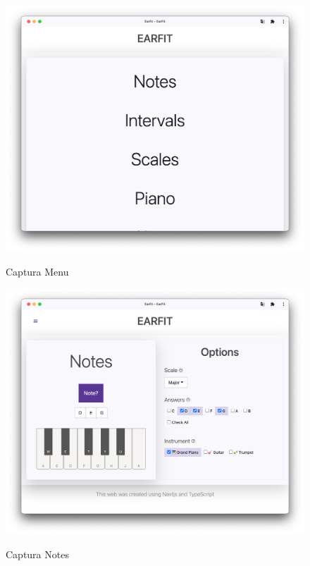 \documentclass[12pt,twoside,titlepage]{report}
\begin{document}
{\begin{figure}[H]
    \centering
    \includegraphics[scale=0.3]{Capturas Earfit/Tablet/Menu}
    \label{fig:TabletMenu}
    \caption{Captura Menu}
\end{figure}

\begin{figure}[H]
    \centering
    \includegraphics[scale=0.3]{Capturas Earfit/Tablet/Notes}
    \label{fig:TabletNotes}
    \caption{Captura Notes}
\end{figure}

}
\end{document}
